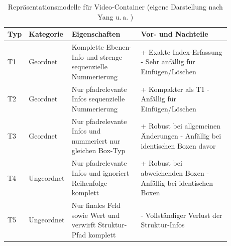\begin{table}
    \centering
    \begin{tabular}{>{\raggedright\arraybackslash}p{0.05\linewidth}>{\raggedright\arraybackslash}p{0.12\linewidth}>{\raggedright\arraybackslash}p{0.31\linewidth}>{\raggedright\arraybackslash}p{0.4\linewidth}}\toprule
         \textbf{Typ}&  \textbf{Kategorie}&  \textbf{Eigenschaften}& \textbf{Vor- und Nachteile}\\\midrule
         T1&  Geordnet& 
         Komplette Ebenen-Info und strenge sequenzielle Nummerierung&+ Exakte Index-Erfassung\newline
- Sehr anfällig für Einfügen/Löschen\\\midrule
         T2&  Geordnet&  Nur pfadrelevante Infos sequenzielle Nummerierung&+ Kompakter als T1\newline
- Anfällig für Einfügen/Löschen\\\midrule
         T3&  Geordnet&  Nur pfadrelevante Infos und nummeriert nur gleichen Box-Typ&+ Robust bei allgemeinen Änderungen\newline
- Anfällig bei identischen Boxen davor\\\midrule
         T4&  Ungeordnet&  Nur pfadrelevante Infos und ignoriert Reihenfolge komplett&+ Robust bei abweichenden Boxen\newline
- Anfällig bei identischen Boxen\\\midrule
         T5&  Ungeordnet&  Nur finales Feld sowie Wert und verwirft Struktur-Pfad komplett& - Vollständiger Verlust der Struktur-Infos\\ \bottomrule
    \end{tabular}
    \caption{Repräsentationsmodelle für Video-Container (eigene Darstellung nach Yang u.\,a. \cite[Tab. 2]{yang_comprehensive_2025})}
    \label{tab:yang}
\end{table}

